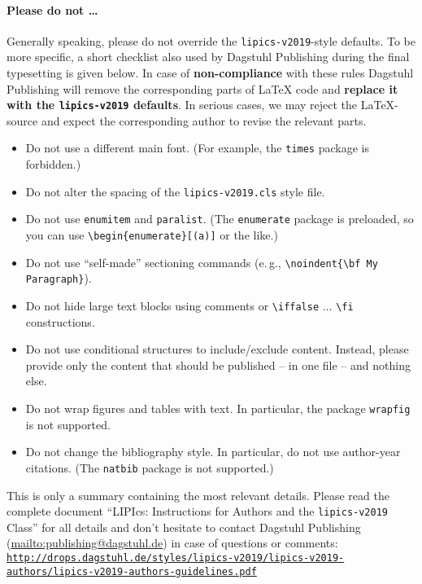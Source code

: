 \documentclass[a4paper,UKenglish,cleveref, autoref]{lipics-v2019}
\begin{document}
\paragraph*{Please do not \ldots} %
Generally speaking, please do not override the \texttt{lipics-v2019}-style defaults. To be more specific, a short checklist also used by Dagstuhl Publishing during the final typesetting is given below.
In case of \textbf{non-compliance} with these rules Dagstuhl Publishing will remove the corresponding parts of \LaTeX{} code and \textbf{replace it with the \texttt{lipics-v2019} defaults}. In serious cases, we may reject the LaTeX-source and expect the corresponding author to revise the relevant parts.
\begin{itemize}
\item Do not use a different main font. (For example, the \texttt{times} package is forbidden.)
\item Do not alter the spacing of the \texttt{lipics-v2019.cls} style file.
\item Do not use \verb+enumitem+ and \verb+paralist+. (The \texttt{enumerate} package is preloaded, so you can use
 \verb+\begin{enumerate}[(a)]+ or the like.)
\item Do not use ``self-made'' sectioning commands (e.\,g., \verb+\noindent{\bf My+ \verb+Paragraph}+).
\item Do not hide large text blocks using comments or \verb+\iffalse+ $\ldots$ \verb+\fi+ constructions. 
\item Do not use conditional structures to include/exclude content. Instead, please provide only the content that should be published -- in one file -- and nothing else.
\item Do not wrap figures and tables with text. In particular, the package \texttt{wrapfig} is not supported.
\item Do not change the bibliography style. In particular, do not use author-year citations. (The
\texttt{natbib} package is not supported.)
\end{itemize}

\enlargethispage{\baselineskip}

This is only a summary containing the most relevant details. Please read the complete document ``LIPIcs: Instructions for Authors and the \texttt{lipics-v2019} Class'' for all details and don't hesitate to contact Dagstuhl Publishing (\url{mailto:publishing@dagstuhl.de}) in case of questions or comments:
\href{http://drops.dagstuhl.de/styles/lipics-v2019/lipics-v2019-authors/lipics-v2019-authors-guidelines.pdf}{\texttt{http://drops.dagstuhl.de/styles/lipics-v2019/\newline lipics-v2019-authors/lipics-v2019-authors-guidelines.pdf}}
\end{document}
